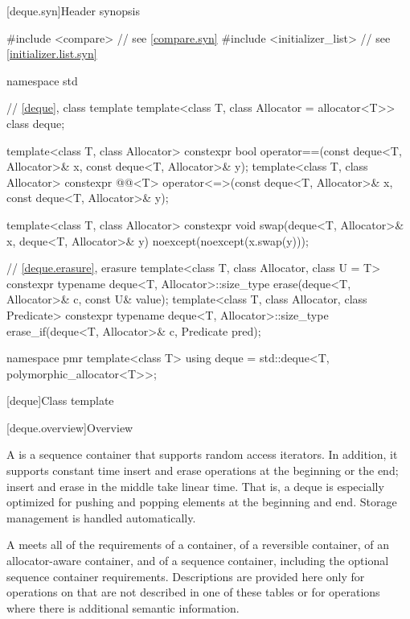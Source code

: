 [deque.syn]{Header  synopsis}

%
\begin{codeblock}
#include <compare>              // see \ref{compare.syn}
#include <initializer_list>     // see \ref{initializer.list.syn}

namespace std {
  // \ref{deque}, class template 
  template<class T, class Allocator = allocator<T>> class deque;

  template<class T, class Allocator>
    constexpr bool operator==(const deque<T, Allocator>& x, const deque<T, Allocator>& y);
  template<class T, class Allocator>
    constexpr @@<T>
      operator<=>(const deque<T, Allocator>& x, const deque<T, Allocator>& y);

  template<class T, class Allocator>
    constexpr void swap(deque<T, Allocator>& x, deque<T, Allocator>& y)
      noexcept(noexcept(x.swap(y)));

  // \ref{deque.erasure}, erasure
  template<class T, class Allocator, class U = T>
    constexpr typename deque<T, Allocator>::size_type
      erase(deque<T, Allocator>& c, const U& value);
  template<class T, class Allocator, class Predicate>
    constexpr typename deque<T, Allocator>::size_type
      erase_if(deque<T, Allocator>& c, Predicate pred);

  namespace pmr {
    template<class T>
      using deque = std::deque<T, polymorphic_allocator<T>>;
  }
}
\end{codeblock}

[deque]{Class template }

[deque.overview]{Overview}

\pnum
A
%
is a sequence container that supports random access iterators.
In addition, it supports constant time insert and erase operations at the beginning or the end;
insert and erase in the middle take linear time.
That is, a deque is especially optimized for pushing and popping elements at the beginning and end.
Storage management is handled automatically.

\pnum
A  meets all of the requirements
of a container,
of a reversible container,
of an allocator-aware container, and
of a sequence container,
including the optional sequence container requirements.
Descriptions are provided here only for operations on
that are not described in one of these tables
or for operations where there is additional semantic information.

